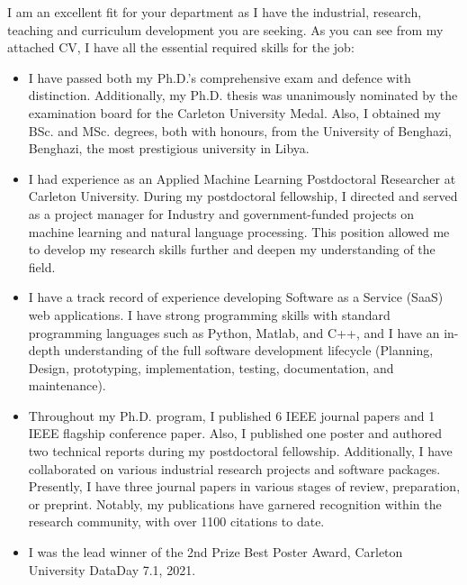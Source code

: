 \documentclass[letterpaper,11pt,oneside]{article}
\newcommand{\ignore}[1]{}
\begin{document}
I am an excellent fit for your department as I have the industrial, research, teaching and curriculum development \ignore{, and funding experience} you are seeking. As you can see from my attached CV, I have all the essential required skills for the job:

\begin{itemize}
    \item I have passed both my Ph.D.'s comprehensive exam and defence with distinction. Additionally, my Ph.D. thesis was unanimously nominated by the examination board for the Carleton University Medal. Also, I obtained my BSc. and MSc. degrees, both with honours, from the University of Benghazi, Benghazi, the most prestigious university in Libya.
    \item I had experience as an Applied Machine Learning Postdoctoral Researcher at Carleton University. 
    During my postdoctoral fellowship, I directed and served as a project manager for Industry and government-funded projects on machine learning and natural language processing. This position allowed me to develop my research skills further and deepen my understanding of the field.
    \item    I have a track record of experience developing Software as a Service (SaaS) web applications. I have strong programming skills with standard programming languages such as Python, Matlab, and C++, and  I have an in-depth understanding of the full software development lifecycle (Planning, Design, prototyping, implementation, testing, documentation, and maintenance).
    \item Throughout my Ph.D. program, I published 6 IEEE journal papers and 1 IEEE flagship conference paper. Also, I published one poster and authored two technical reports during my postdoctoral fellowship. Additionally, I have collaborated on various industrial research projects and software packages. Presently, I have three journal papers in various stages of review, preparation, or preprint. Notably, my publications have garnered recognition within the research community, with over 1100 citations to date.
    \item I was the lead winner of the 2nd Prize Best Poster Award, Carleton University DataDay 7.1, 2021. 

\end{itemize}
\end{document}
